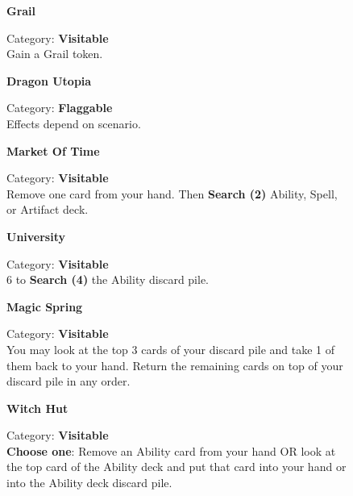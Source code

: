\begin{figure}[H]
  \begin{minipage}[t]{0.48\textwidth}
    \centering
    \textbf{Grail}\\
    \caption{ \scriptsize Category: \textbf{Visitable}\\
      Gain a Grail token.}
  \end{minipage}\hfill
  \begin{minipage}[t]{0.48\textwidth}
    \centering
    \textbf{Dragon Utopia}\\
    \caption{ \scriptsize Category: \textbf{Flaggable}\\Effects depend on scenario.}
  \end{minipage}
\end{figure}

\begin{figure}[H]
  \begin{minipage}[t]{0.48\textwidth}
    \centering
    \textbf{Market Of Time}\\
    \caption{ \scriptsize Category: \textbf{Visitable}\\ Remove one card from your hand.
Then \textbf{Search (2)} Ability, Spell, or Artifact deck.}
  \end{minipage}\hfill
  \begin{minipage}[t]{0.48\textwidth}
    \centering
    \textbf{University}\\
    \caption{ \scriptsize Category: \textbf{Visitable}\\
       6  to \textbf{Search (4)} the Ability discard pile.}
  \end{minipage}
\end{figure}

\begin{figure}[H]
  \begin{minipage}[t]{0.48\textwidth}
    \centering
    \textbf{Magic Spring}\\
    \caption{ \scriptsize Category: \textbf{Visitable}\\
      You may look at the top 3 cards of your discard pile and take 1 of them back to your hand.
      Return the remaining cards on top of your discard pile in any order.}
  \end{minipage}\hfill
  \begin{minipage}[t]{0.48\textwidth}
    \centering
    \textbf{Witch Hut}\\
    \caption{ \scriptsize Category: \textbf{Visitable}\\
      \textbf{Choose one}: Remove an Ability card from your hand OR look at the top card of the Ability deck and put that card into your hand or into the Ability deck discard pile.}
  \end{minipage}
\end{figure}

